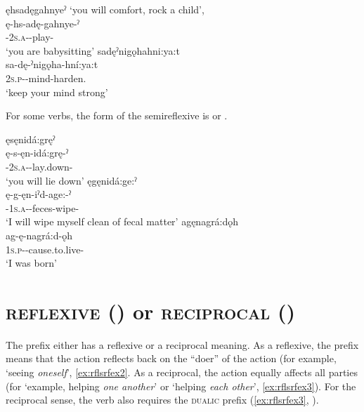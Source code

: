 \ea\label{ex:rflsrfex100}
\ea ęhsadęgahnyeˀ ‘you will comfort, rock a child’,\\
\gll ę-hs-adę-gahnye-ˀ\\
 \fut-\textsc{2s.a}-{\semireflexive}-play-{\stative}\\
\glt `you are babysitting'
\ex sadęˀnigǫhahni:ya:t\\
\gll sa-dę-ˀnigǫha-hní:ya:t\\
 \textsc{2s.p}-{\semireflexive}-mind-harden.{\noaspect}\\
\glt `keep your mind strong'
\z
\z

For some verbs, the form of the semireflexive is  or  .

\ea\label{ex:rflsrfex101}
\ea ęsęnidá:gręˀ\\
\gll ę-s-ęn-idá:grę-ˀ\\
 \fut-\textsc{2s.a}-{\semireflexive}-lay.down-{\punctual}\\
\glt `you will lie down'
\ex ęgęnidá:ge:ˀ\\
\gll ę-g-ęn-iˀd-age:-ˀ\\
 \fut-\textsc{1s.a}-{\semireflexive}-feces-wipe-{\punctual} \\
\glt `I will wipe myself clean of fecal matter'
\ex agęnagrá:dǫh\\
\gll ag-ę-nagrá:d-ǫh\\
 \textsc{1s.p}-{\semireflexive}-cause.to.live-{\stative}\\
\glt `I was born'
\z
\z	

\section{ \textsc{reflexive} () or \textsc{reciprocal} (\reciprocal)} \label{[adad-] (reflexive or reciprocal)}
The  prefix either has a reflexive or a reciprocal meaning. As a reflexive, the  prefix means that the action reflects back on the “doer” of the action (for example, ‘seeing \emph{oneself}’, \ref{ex:rflsrfex2}. As a reciprocal, the action equally affects all parties (for ‘example, helping \emph{one another}’ or ‘helping \emph{each other}’, \ref{ex:rflsrfex3}). For the reciprocal sense, the verb also requires the  \textsc{dualic} prefix (\ref{ex:rflsrfex3}, \cite[127]{michelson_ontario_2011}).

